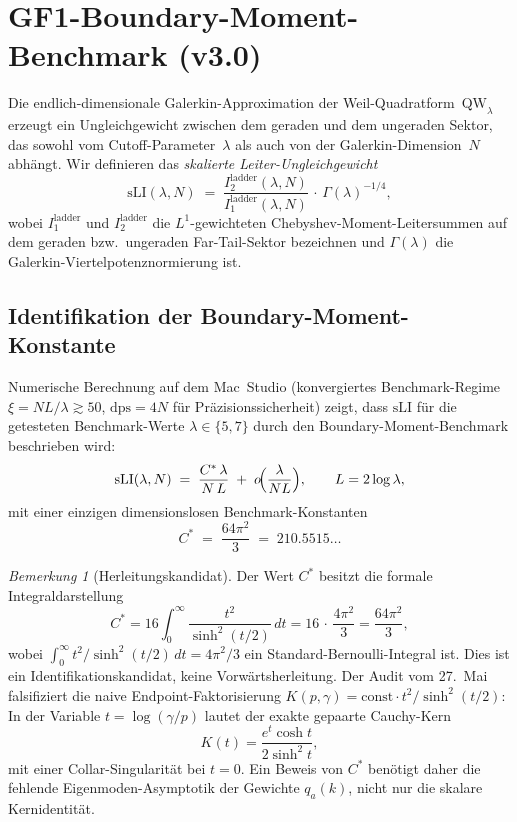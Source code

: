 ﻿\documentclass[12pt,a4paper]{article}
\theoremstyle{definition}
\theoremstyle{remark}
\newtheorem{remark}[theorem]{Bemerkung}
\begin{document}
\section{GF1-Boundary-Moment-Benchmark (v3.0)}
\label{sec:gf1}

Die endlich-dimensionale Galerkin-Approximation der Weil-Quadratform~$\mathrm{QW}_\lambda$ erzeugt ein Ungleichgewicht zwischen dem geraden und dem ungeraden Sektor, das sowohl vom Cutoff-Parameter~$\lambda$ als auch von der Galerkin-Dimension~$N$ abhängt. Wir definieren das \emph{skalierte Leiter-Ungleichgewicht}
\begin{equation}
\label{eq:sLI}
\mathrm{sLI}(\lambda, N) \;=\; \frac{I_2^{\mathrm{ladder}}(\lambda,N)}{I_1^{\mathrm{ladder}}(\lambda,N)}\,\cdot\,\Gamma(\lambda)^{-1/4},
\end{equation}
wobei $I_1^{\mathrm{ladder}}$ und $I_2^{\mathrm{ladder}}$ die $L^1$-gewichteten Chebyshev-Moment-Leitersummen auf dem geraden bzw.\ ungeraden Far-Tail-Sektor bezeichnen und $\Gamma(\lambda)$ die Galerkin-Viertelpotenznormierung ist.

\subsection{Identifikation der Boundary-Moment-Konstante}

Numerische Berechnung auf dem Mac~Studio (konvergiertes Benchmark-Regime
$\xi=NL/\lambda \gtrsim 50$, $\mathrm{dps} = 4N$ für
Präzisionssicherheit) zeigt, dass $\mathrm{sLI}$ für die getesteten
Benchmark-Werte $\lambda\in\{5,7\}$ durch den Boundary-Moment-Benchmark
beschrieben wird:
\begin{equation}
\label{eq:gf1-scaling}
\mathrm{sLI}(\lambda, N) \;=\; \frac{C^*\,\lambda}{N\,L} \;+\; o\!\Bigl(\frac{\lambda}{NL}\Bigr), \qquad L = 2\log\lambda,
\end{equation}
mit einer einzigen dimensionslosen Benchmark-Konstanten
\begin{equation}
\label{eq:Cstar}
C^* \;=\; \frac{64\pi^2}{3} \;=\; 210.5515\ldots
\end{equation}

\begin{remark}[Herleitungskandidat]
\label{rem:cstar-derivation}
Der Wert $C^*$ besitzt die formale Integraldarstellung
\[
C^* = 16 \int_0^\infty \frac{t^2}{\sinh^2(t/2)}\,dt = 16\,\cdot\,\frac{4\pi^2}{3} = \frac{64\pi^2}{3},
\]
wobei $\int_0^\infty t^2/\sinh^2(t/2)\,dt = 4\pi^2/3$ ein Standard-Bernoulli-Integral ist. Dies ist ein Identifikationskandidat, keine Vorwärtsherleitung. Der Audit vom 27.~Mai falsifiziert die naive Endpoint-Faktorisierung
$K(p,\gamma)=\mathrm{const}\cdot t^2/\sinh^2(t/2)$: In der Variable
$t=\log(\gamma/p)$ lautet der exakte gepaarte Cauchy-Kern
\[
  K(t)=\frac{e^t\cosh t}{2\sinh^2 t},
\]
mit einer Collar-Singularität bei $t=0$. Ein Beweis von $C^*$ benötigt
daher die fehlende Eigenmoden-Asymptotik der Gewichte $q_a(k)$, nicht nur
die skalare Kernidentität.
\end{remark}
\end{document}
